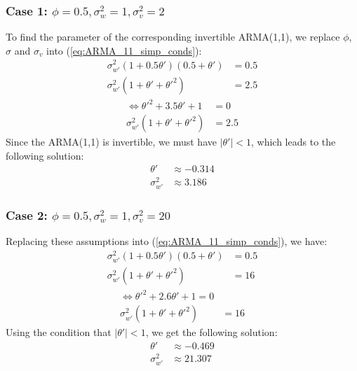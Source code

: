 \subsubsection{Case 1: $\phi = 0.5, \sigma_w^2 = 1, \sigma_v^2 = 2$}
To find the parameter of the corresponding invertible ARMA(1,1), we replace $\phi$, $\sigma$ and $\sigma_v$ into (\ref{eq:ARMA_11_simp_conds}):
\begin{equation}
\begin{split}
	\sigma^2_{w'}(1+0.5\theta')(0.5+\theta') &= 0.5 \\
	\sigma^2_{w'}(1+\theta'+\theta'^2) &= 2.5
\end{split}
\end{equation}
\begin{equation}
\begin{split}
\Leftrightarrow
	\theta'^2 + 3.5\theta' + 1 &= 0\\
	\sigma^2_{w'}(1+\theta'+\theta'^2) &= 2.5
\end{split}
\end{equation}
 Since the ARMA(1,1) is invertible, we must have $|\theta'| < 1$, which leads to the following solution:
 \begin{equation} \label{eq:ARMA_11_case1}
 \begin{split}
 \theta' &\approx -0.314 \\
 \sigma_{w'}^2 &\approx 3.186
 \end{split}
 \end{equation}
\subsubsection{Case 2: $\phi = 0.5, \sigma_w^2 = 1, \sigma_v^2 = 20$}
 Replacing these assumptions into (\ref{eq:ARMA_11_simp_conds}), we have:
  \begin{equation}
  \begin{split}
  \sigma^2_{w'}(1+0.5\theta')(0.5+\theta') &= 0.5 \\
  \sigma^2_{w'}(1+\theta'+\theta'^2) &= 16
  \end{split}
  \end{equation}
  \begin{equation}
  \begin{split}
    \Leftrightarrow
    \theta'^2 + 2.6\theta'+1 = 0 \\
    \sigma^2_{w'}(1+\theta'+\theta'^2) &= 16
  \end{split}
  \end{equation}
Using the condition that $|\theta'|<1$, we get the following solution:
\begin{equation} \label{eq:ARMA_11_case2}
\begin{split}
	\theta' &\approx -0.469 \\
	\sigma^2_{w'} &\approx 21.307
\end{split}
\end{equation}
